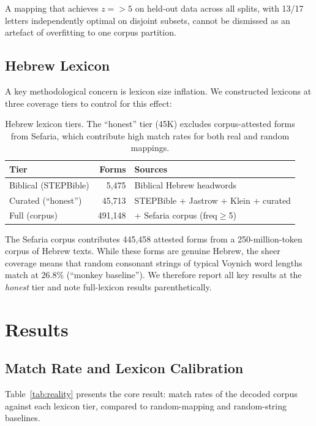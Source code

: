 \documentclass[11pt,a4paper]{article}
\newcommand{\zs}[1]{$z=#1$}
\begin{document}
A mapping that achieves \zs{>5} on held-out data across all splits, with
13/17 letters independently optimal on disjoint subsets, cannot be
dismissed as an artefact of overfitting to one corpus partition.

\subsection{Hebrew Lexicon}
\label{sec:lexicon}

A key methodological concern is lexicon size inflation. We constructed
lexicons at three coverage tiers to control for this effect:

\begin{table}[htbp]
\centering
\caption{Hebrew lexicon tiers. The ``honest'' tier (45K) excludes
corpus-attested forms from Sefaria, which contribute high match rates for
both real and random mappings.}
\label{tab:lexicon}
\small
\begin{tabular}{@{}lrl@{}}
\toprule
Tier & Forms & Sources \\
\midrule
Biblical (STEPBible) & 5,475 & Biblical Hebrew headwords \\
Curated (``honest'') & 45,713 & STEPBible + Jastrow + Klein + curated \\
Full (corpus) & 491,148 & + Sefaria corpus (freq$\ge$5) \\
\bottomrule
\end{tabular}
\end{table}

The Sefaria corpus contributes 445,458 attested forms from a 250-million-token
corpus of Hebrew texts. While these forms are genuine Hebrew, the sheer
coverage means that random consonant strings of typical Voynich word lengths
match at $26.8\%$ (``monkey baseline''). We therefore report all key results
at the \emph{honest} tier and note full-lexicon results parenthetically.


\section{Results}
\label{sec:results}

\subsection{Match Rate and Lexicon Calibration}
\label{sec:matchrate}

Table~\ref{tab:reality} presents the core result: match rates of the decoded
corpus against each lexicon tier, compared to random-mapping and
random-string baselines.
\end{document}
